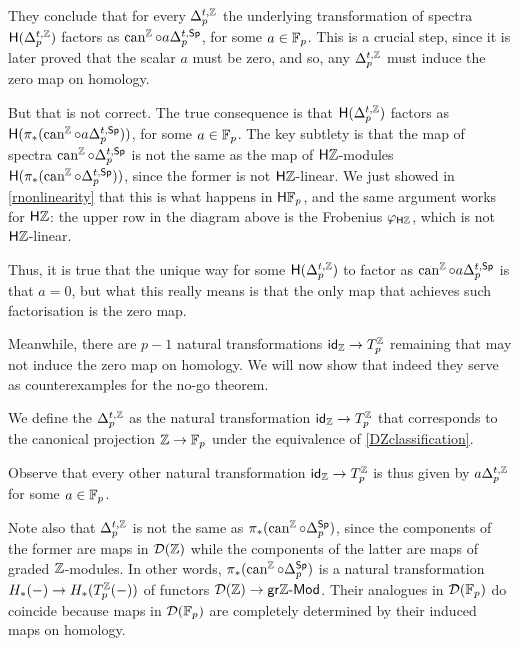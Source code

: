 \begin{remark}
	They conclude that for every \(\Delta_p^{t, \mathbb{Z}}\) the underlying transformation of spectra \(\mathsf{H}(\Delta_p^{t, \mathbb{Z}})\) factors as \(\operatorname{can}^{\mathbb{Z}}\circ a \Delta_p^{t,\mathsf{Sp}}\), for some \(a\in{\mathbb{F}_p}\).
	This is a crucial step, since it is later proved that the scalar \(a\) must be zero, and so, any \(\Delta_p^{t, \mathbb{Z}}\) must induce the zero map on homology.
	
	But that is not correct.
	The true consequence is that \(\mathsf{H}(\Delta_p^{t, \mathbb{Z}})\) factors as \(\mathsf{H} (\pi_*(\operatorname{can}^{\mathbb{Z}}\circ a\Delta_p^{t,\mathsf{Sp}}))\), for some \(a\in{\mathbb{F}_p}\).	
	The key subtlety is that the map of spectra \(\operatorname{can}^{\mathbb{Z}}\circ \Delta_p^{t,\mathsf{Sp}}\) is not the same as the map of \(\mathsf{H} \mathbb{Z}\)-modules \(\mathsf{H} (\pi_*(\operatorname{can}^{\mathbb{Z}}\circ \Delta_p^{t,\mathsf{Sp}}))\), since the former is not \(\mathsf{H}\mathbb{Z}\)-linear.
	We just showed in \cref{rnonlinearity} that this is what happens in \(\mathsf{H}{\mathbb{F}_p}\), and the same argument works for \(\mathsf{H}\mathbb{Z}\): the upper row in the diagram above is the Frobenius \(\varphi_{\mathsf{H}\mathbb{Z}}\), which is not \(\mathsf{H}\mathbb{Z}\)-linear.
		
	Thus, it is true that the unique way for some \(\mathsf{H}(\Delta_p^{t, \mathbb{Z}})\) to factor as \(\operatorname{can}^{\mathbb{Z}}\circ a \Delta_p^{t,\mathsf{Sp}}\) is that \(a=0\), but what this really means is that the only map that achieves such factorisation is the zero map.
	
	Meanwhile, there are \(p-1\) natural transformations \(\mathsf{id}_{\mathbb{Z}} \to T_p^{\mathbb{Z}}\) remaining that may not induce the zero map on homology. We will now show that indeed they serve as counterexamples for the no-go theorem.
\end{remark}

\begin{definition}\label{ZTatediag}
	We define the  \(\Delta_p^{t,\mathbb{Z}}\) as the natural transformation \(\mathsf{id}_{\mathbb{Z}} \to T_p^{\mathbb{Z}}\) that corresponds to the canonical projection \(\mathbb{Z}\to{\mathbb{F}_p}\) under the equivalence of \cref{DZclassification}.
\end{definition}

Observe that every other natural transformation \(\mathsf{id}_{\mathbb{Z}} \to T_p^{\mathbb{Z}}\) is thus given by \(a\Delta_p^{t,\mathbb{Z}}\) for some \(a\in {\mathbb{F}_p}\).

Note also that \(\Delta_p^{t,\mathbb{Z}}\) is not the same as \(\pi_*(\operatorname{can}^{\mathbb{Z}} \circ \Delta_p^{\mathsf{Sp}})\), since the components of the former are maps in \(\mathcal{D}(\mathbb{Z})\) while the components of the latter are maps of graded \(\mathbb{Z}\)-modules. In other words, \(\pi_*(\operatorname{can}^{\mathbb{Z}} \circ \Delta_p^{\mathsf{Sp}})\) is a natural transformation \(H_*(-)\to H_*(T_p^{\mathbb{Z}}(-))\) of functors \(\mathcal{D}(\mathbb{Z})\to \mathsf{gr}\mathbb{Z}\text{-}\mathsf{Mod}\). Their analogues in \(\mathcal{D}({\mathbb{F}_p})\) do coincide because maps in \(\mathcal{D}({\mathbb{F}_p})\) are completely determined by their induced maps on homology.

